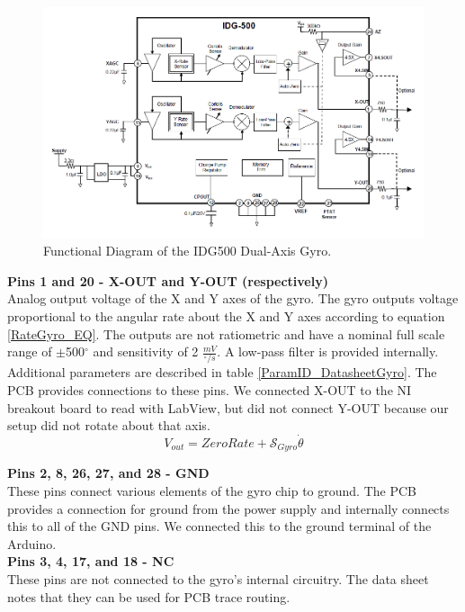 \documentclass{article}
\theoremstyle{plain}
\theoremstyle{definition}
\theoremstyle{remark}
\newcommand{\Sens}{\mathcal{S}}
\begin{document}
\begin{figure}[hbt]
\begin{center}
\includegraphics[width = 16cm]{IDG500Functional.png}
\caption{Functional Diagram of the IDG500 Dual-Axis Gyro.}
\label{gyroFunc}
\end{center}
\end{figure}

\textbf{Pins 1 and 20 - X-OUT and Y-OUT (respectively)}\\
Analog output voltage of the X and Y axes of the gyro. The gyro outputs voltage proportional to the angular rate about the X and Y axes according to equation \ref{RateGyro_EQ}. The outputs are not ratiometric and have a nominal full scale range of $\pm$500$^{\circ}$ and sensitivity of 2 $\frac{mV}{^{\circ}/s}$.  A low-pass filter is provided internally.  Additional parameters are described in table \ref{ParamID_DatasheetGyro}.  The PCB provides connections to these pins. We connected X-OUT to the NI breakout board to read with LabView, but did not connect Y-OUT because our setup did not rotate about that axis.\\

\begin{equation}
V_{out} = ZeroRate + \Sens_{Gyro} \dot{\theta} 
\label{RateGyro_EQ}
\end{equation}

\textbf{Pins 2, 8, 26, 27, and 28 - GND}\\
These pins connect various elements of the gyro chip to ground. The PCB provides a connection for ground from the power supply and internally connects this to all of the GND pins. We connected this to the ground terminal of the Arduino.\\

\textbf{Pins 3, 4, 17, and 18 - NC}\\
These pins are not connected to the gyro's internal circuitry. The data sheet notes that they can be used for PCB trace routing.\\
\end{document}
